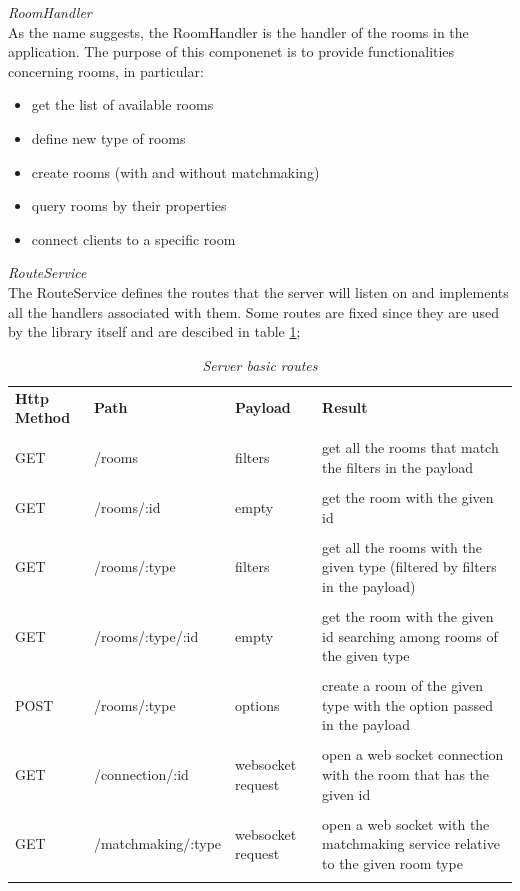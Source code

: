 \bigskip
\textit{RoomHandler}
\\
As the name suggests, the RoomHandler is the handler of the rooms in the application. The purpose of this componenet is to provide functionalities concerning rooms, in particular:
\begin{itemize}
	\item get the list of available rooms
	\item define new type of rooms
	\item create rooms (with and without matchmaking)
	\item query rooms by their properties
	\item connect clients to a specific room
\end{itemize}

\bigskip
\textit{RouteService}
\\
The RouteService defines the routes that the server will listen on and implements all the handlers associated with them. Some routes are fixed since they are used by the library itself and are descibed in table \ref{table:server_routes}; 


\begin{table}[H]
	\begin{tabular}{p{2cm}p{4cm}p{2cm}p{5.5cm}}
		\textbf{Http Method} & \textbf{Path}	  & \textbf{Payload}  & \textbf{Result}                                                            		\\\\
		GET                  & /rooms             & filters           & get all the rooms that match the filters in the payload                        	\\\\
		GET                  & /rooms/:id         & empty             & get the room with the given id                                                 	\\\\
		GET                  & /rooms/:type       & filters           & get all the rooms with the given type (filtered by filters in the payload)     	\\\\
		GET                  & /rooms/:type/:id   & empty             & get the room with the given id searching among rooms of the given type         	\\\\
		POST                 & /rooms/:type       & options           & create a room of the given type with the option passed in the payload          	\\\\
		GET                  & /connection/:id    & websocket request & open a web socket connection with the room that has the given id               	\\\\
		GET                  & /matchmaking/:type & websocket request & open a web socket with the matchmaking service relative to the given room type 	\\\\
	\end{tabular}
	\caption{\label{table:server_routes} \textit{Server basic routes}}
\end{table}

